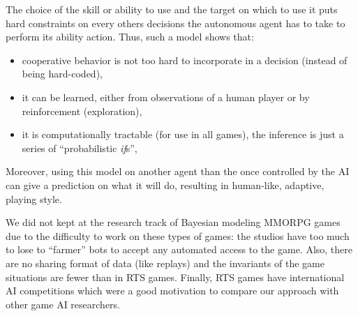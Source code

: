 The choice of the skill or ability to use and the target on which to use it puts hard constraints on every others decisions the autonomous agent has to take to perform its ability action. Thus, such a model shows that:
\begin{itemize}
    \item cooperative behavior is not too hard to incorporate in a decision (instead of being hard-coded),
    \item it can be learned, either from observations of a human player or by reinforcement (exploration),
    \item it is computationally tractable (for use in all games), the inference is just a series of ``probabilistic \textit{if}s'',
\end{itemize}
Moreover, using this model on another agent than the once controlled by the AI can give a prediction on what it will do, resulting in human-like, adaptive, playing style.

We did not kept at the research track of Bayesian modeling MMORPG games due to the difficulty to work on these types of games: the studios have too much to lose to ``farmer'' bots to accept any automated access to the game. Also, there are no sharing format of data (like replays) and the invariants of the game situations are fewer than in RTS games. Finally, RTS games have international AI competitions which were a good motivation to compare our approach with other game AI researchers.
